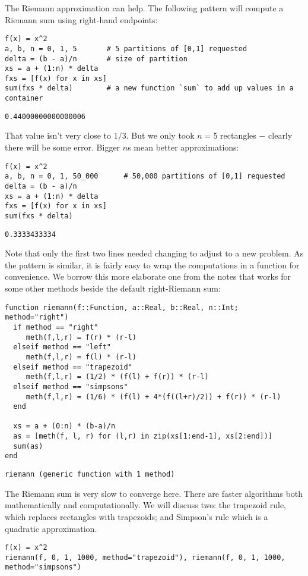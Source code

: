 \documentclass[12pt]{article}
\begin{document}
The Riemann approximation can help. The following pattern will compute a Riemann sum using right-hand endpoints:\begin{verbatim}
f(x) = x^2
a, b, n = 0, 1, 5		# 5 partitions of [0,1] requested
delta = (b - a)/n		# size of partition
xs = a + (1:n) * delta	
fxs = [f(x) for x in xs]
sum(fxs * delta)		# a new function `sum` to add up values in a container
\end{verbatim}
\begin{verbatim}
0.44000000000000006\end{verbatim}
\newline
That value isn't very close to $1/3$. But we only took $n=5$ rectangles $-$ clearly there will be some error. Bigger $n$s mean better approximations:\begin{verbatim}
f(x) = x^2
a, b, n = 0, 1, 50_000		# 50,000 partitions of [0,1] requested
delta = (b - a)/n		
xs = a + (1:n) * delta	
fxs = [f(x) for x in xs]
sum(fxs * delta)
\end{verbatim}
\begin{verbatim}
0.3333433334\end{verbatim}
\newline
Note that only the first two lines needed changing to adjust to a new problem. As the pattern is similar, it is fairly easy to wrap the computations in a function for convenience. We borrow this more elaborate one from the notes that works for some other methods beside the default right-Riemann sum:\begin{verbatim}
function riemann(f::Function, a::Real, b::Real, n::Int; method="right")
  if method == "right"
     meth(f,l,r) = f(r) * (r-l)
  elseif method == "left"
     meth(f,l,r) = f(l) * (r-l)
  elseif method == "trapezoid"
     meth(f,l,r) = (1/2) * (f(l) + f(r)) * (r-l)
  elseif method == "simpsons"
     meth(f,l,r) = (1/6) * (f(l) + 4*(f((l+r)/2)) + f(r)) * (r-l)
  end

  xs = a + (0:n) * (b-a)/n
  as = [meth(f, l, r) for (l,r) in zip(xs[1:end-1], xs[2:end])]
  sum(as)
end
\end{verbatim}
\begin{verbatim}
riemann (generic function with 1 method)\end{verbatim}
\newline
The Riemann sum is very slow to converge here. There are faster algorithms both mathematically and computationally. We will discuss two: the trapezoid rule, which replaces rectangles with trapezoids; and Simpson's rule which is a quadratic approximation.\begin{verbatim}
f(x) = x^2
riemann(f, 0, 1, 1000, method="trapezoid"), riemann(f, 0, 1, 1000, method="simpsons")
\end{verbatim}
\end{document}
